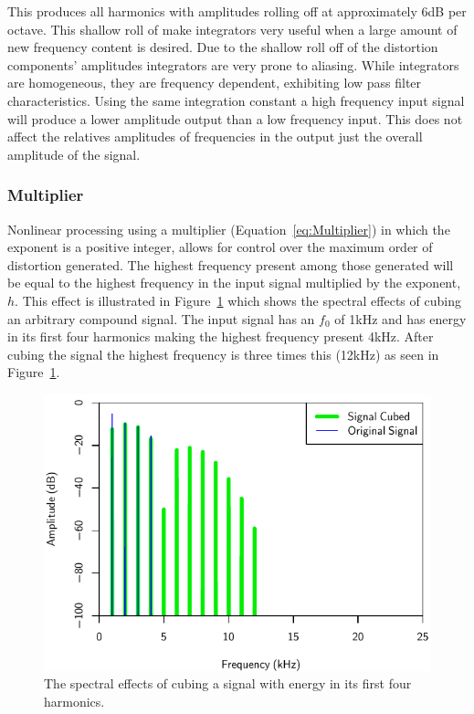			This produces all harmonics with amplitudes rolling off at approximately 6dB per octave. This
			shallow roll of make integrators very useful when a large amount of new frequency content is
			desired. Due to the shallow roll off of the distortion components' amplitudes integrators are very
			prone to aliasing. While integrators are homogeneous, they are frequency dependent, exhibiting low
			pass filter characteristics. Using the same integration constant a high frequency input signal will
			produce a lower amplitude output than a low frequency input. This does not affect the relatives
			amplitudes of frequencies in the output just the overall amplitude of the signal.

		\subsubsection*{Multiplier}
			Nonlinear processing using a multiplier (Equation~\ref{eq:Multiplier}) in which the exponent is a
			positive integer, allows for control over the maximum order of distortion generated. The highest
			frequency present among those generated will be equal to the highest frequency in the input signal
			multiplied by the exponent, $h$. This effect is illustrated in Figure~\ref{fig:CubedSpectra} which
			shows the spectral effects of cubing an arbitrary compound signal. The input signal has an $f_{0}$
			of 1kHz and has energy in its first four harmonics making the highest frequency present 4kHz. After
			cubing the signal the highest frequency is three times this (12kHz) as seen in
			Figure~\ref{fig:CubedSpectra}.

			\begin{figure}[h!]
				\centering
				\includegraphics{chapter5/Images/CubedSpectra.pdf}
				\caption{The spectral effects of cubing a signal with energy in its first four harmonics.}
				\label{fig:CubedSpectra}
			\end{figure}

